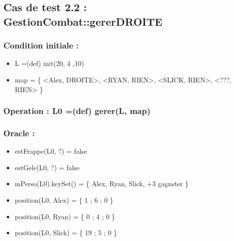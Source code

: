 \documentclass[11pt]{article}
\begin{document}
\subsection{Cas de test 2.2 : GestionCombat::gererDROITE}
\label{sec-1.3}

\subsubsection{Condition initiale :}
\label{sec-1.3.1}

\begin{itemize}

\item L =(def) init(20, 4 ,10)\\
\label{sec-1.3.1.1}


\item map = \{ <Alex, DROITE>, <RYAN, RIEN>, <SLICK, RIEN>, <???, RIEN> \}\\
\label{sec-1.3.1.2}

\end{itemize} %
\subsubsection{Operation : L0 =(def) gerer(L, map)}
\label{sec-1.3.2}

\subsubsection{Oracle :}
\label{sec-1.3.3}

\begin{itemize}

\item estFrappe(L0, ?) = false\\
\label{sec-1.3.3.1}


\item estGele(L0, ?) = false\\
\label{sec-1.3.3.2}


\item mPerso(L0).keySet() = \{ Alex, Ryan, Slick, +3 gagnster \}\\
\label{sec-1.3.3.3}


\item position(L0, Alex) = \{ 1 ; 6 ; 0 \}\\
\label{sec-1.3.3.4}


\item position(L0, Ryan) = \{ 0 ; 4 ; 0 \}\\
\label{sec-1.3.3.5}


\item position(L0, Slick) = \{ 19 ; 5 ; 0 \}\\
\label{sec-1.3.3.6}


\end{itemize} %
\end{document}
